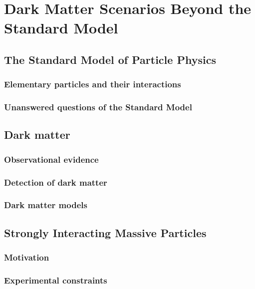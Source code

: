 \graphicspath{{chapt_dutch/}{intro/}{chapt2/}{chapt3/}{chapt4/}{chapt5/}}

\renewcommand\evenpagerightmark{{\scshape\small The CMS Detector}}
\renewcommand\oddpageleftmark{{\scshape\small Chapter 2}}


\hyphenation{}

\chapter{Dark Matter Scenarios Beyond the Standard Model}
\label{ch2}

\section{The Standard Model of Particle Physics}

\subsection{Elementary particles and their interactions}

\subsection{Unanswered questions of the Standard Model}
\section{Dark matter}

\subsection{Observational evidence}

\subsection{Detection of dark matter}

\subsection{Dark matter models}


\section{Strongly Interacting Massive Particles}

\subsection{Motivation}

\subsection{Experimental constraints}

\clearpage{\pagestyle{empty}\cleardoublepage}

